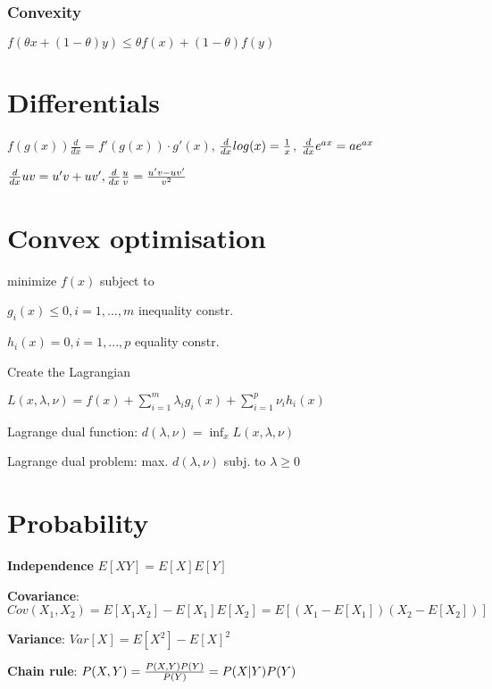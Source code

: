 \documentclass[a4paper,11pt,twocolumn]{article}
\begin{document}

\subsubsection{Convexity}

$f(\theta x + (1-\theta)y) \leq \theta f(x) + (1-\theta) f(y)$

\section{Differentials}

$ f(g(x)) \frac{d}{dx} = f'(g(x)) \cdot g'(x)$, $ {d \over {dx}} log(x) = {1 \over x}$, $ {d \over {dx}} e^{ax} = ae^{ax}$


${d \over {dx}} uv = u'v + uv', {d \over {dx}} {u \over v} = {u'v - uv' \over v^2 }$




\section{Convex optimisation}

minimize $f(x)$ subject to 

$g_i(x) \leq 0, i = 1,...,m$ inequality constr.

$h_i(x) = 0, i = 1,...,p$ equality constr.

Create the Lagrangian

$L(x, \lambda, \nu) = f(x) + \sum_{i=1}^m{\lambda_i g_i(x) + \sum_{i=1}^p{\nu_i h_i(x)}}$

Lagrange dual function: $ d(\lambda, \nu) = \inf_{x} L (x,\lambda, \nu) $

Lagrange dual problem: max. $d(\lambda, \nu)$  subj. to $\lambda \geq 0$

\section{Probability}

\textbf{Independence} $E[XY] = E[X] E[Y]$

\textbf{Covariance}: $Cov(X_1, X_2) = E[X_1 X_2] - E[X_1] E[X_2] = E[(X_1 - E[X_1])(X_2-E[X_2])]$

\textbf{Variance}: $Var[X] = E[X^2] - E[X]^2$


\textbf{Chain rule}: $P(X,Y) = {{P(X,Y)P(Y)}\over{P(Y)}} = P(X|Y)P(Y)$


\end{document}
